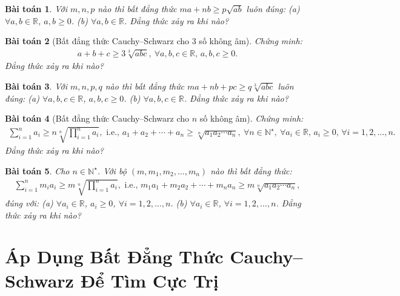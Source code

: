 \documentclass{article}
\newtheorem{baitoan}{Bài toán}
\begin{document}
\begin{baitoan}
	Với $m,n,p$ nào thì bất đẳng thức $ma + nb\ge p\sqrt{ab}$ luôn đúng: (a) $\forall a,b\in\mathbb{R}$, $a,b\ge0$. (b) $\forall a,b\in\mathbb{R}$. Đẳng thức xảy ra khi nào?
\end{baitoan}

\begin{baitoan}[Bất đẳng thức Cauchy--Schwarz cho 3 số không âm]
	Chứng minh:
	\begin{align*}
		\boxed{a + b + c\ge3\sqrt[3]{abc},\ \forall a,b,c\in\mathbb{R},\,a,b,c\ge 0.}
	\end{align*}
	Đẳng thức xảy ra khi nào?
\end{baitoan}

\begin{baitoan}
	Với $m,n,p,q$ nào thì bất đẳng thức $ma + nb + pc\ge q\sqrt[3]{abc}$ luôn đúng: (a) $\forall a,b,c\in\mathbb{R}$, $a,b,c\ge0$. (b) $\forall a,b,c\in\mathbb{R}$. Đẳng thức xảy ra khi nào?
\end{baitoan}

\begin{baitoan}[Bất đẳng thức Cauchy--Schwarz cho $n$ số không âm]
	Chứng minh:
	\begin{align*}
		\sum_{i=1}^n a_i\ge n\sqrt[n]{\prod_{i=1}^n a_i},\mbox{ i.e., } a_1 + a_2 + \cdots + a_n\ge\sqrt[n]{a_1a_2\cdots a_n},\ \forall n\in\mathbb{N}^\star,\ \forall a_i\in\mathbb{R},\,a_i\ge0,\,\forall i = 1,2,\ldots,n.
	\end{align*}
	Đẳng thức xảy ra khi nào?
\end{baitoan}

\begin{baitoan}
	Cho $n\in\mathbb{N}^\star$. Với bộ $(m,m_1,m_2,\ldots,m_n)$ nào thì bất đẳng thức:
	\begin{align*}
		\sum_{i=1}^n m_ia_i\ge m\sqrt[n]{\prod_{i=1}^n a_i},\mbox{ i.e., } m_1a_1 + m_2a_2 + \cdots + m_na_n\ge m\sqrt[n]{a_1a_2\cdots a_n},
	\end{align*}
	đúng với: (a) $\forall a_i\in\mathbb{R}$, $a_i\ge0$, $\forall i = 1,2,\ldots,n$. (b) $\forall a_i\in\mathbb{R}$, $\forall i = 1,2,\ldots,n$.
	Đẳng thức xảy ra khi nào?
\end{baitoan}



\section{Áp Dụng Bất Đẳng Thức Cauchy--Schwarz Để Tìm Cực Trị}
\end{document}

